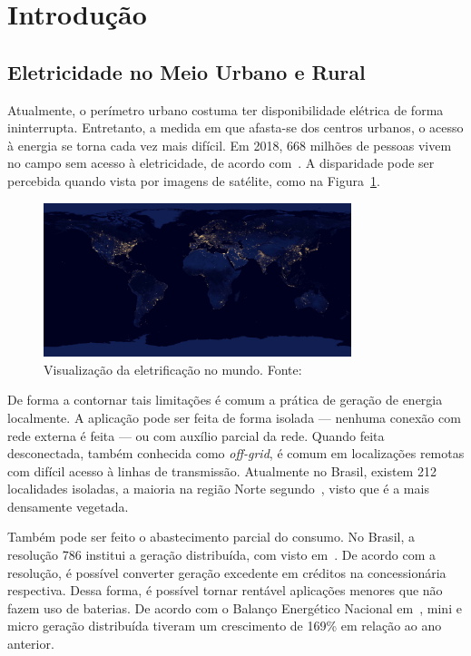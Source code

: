 \clearpage

\section{Introdução}

\subsection{Eletricidade no Meio Urbano e Rural}

Atualmente, o perímetro urbano costuma ter disponibilidade elétrica de forma
ininterrupta. Entretanto, a medida em que afasta-se dos centros urbanos,
o acesso à energia se torna cada vez mais difícil. Em 2018, 668 milhões de
pessoas vivem no campo sem acesso à eletricidade, de acordo com~\cite[pág. 4]{irena:sdg7}.
A disparidade pode ser percebida quando vista por imagens de
satélite, como na Figura~\ref{fig:terra}.

\begin{figure}[h]
    \centering
    \includegraphics[width=0.8\textwidth]{../img/nasa.jpg}
    \caption{Visualização da eletrificação no mundo. Fonte:~\cite{nasa:earth}}\label{fig:terra}
\end{figure}

De forma a contornar tais limitações é comum a prática de geração de energia
localmente. A aplicação pode ser feita de forma isolada --- nenhuma conexão com
rede externa é feita --- ou com auxílio parcial da rede.  Quando feita
desconectada, também conhecida como \emph{off-grid}, é comum em localizações
remotas com difícil acesso à linhas de transmissão. Atualmente no Brasil,
existem 212 localidades isoladas, a maioria na região Norte segundo~\cite{ons:iso},
visto que é a mais densamente vegetada.

Também pode ser feito o abastecimento parcial do consumo.  No Brasil, a
resolução 786 institui a geração distribuída, com visto
em~\cite{aneel:ren482}.  De acordo com a resolução, é possível converter geração
excedente em créditos na concessionária respectiva.  Dessa forma, é possível
tornar rentável aplicações menores que não fazem uso de baterias.  De acordo com
o Balanço Energético Nacional em~\cite{epe:ben2020}, mini e micro geração
distribuída tiveram um crescimento de 169\% em relação ao ano anterior.

